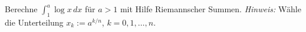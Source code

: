 \begin{prob}
Berechne $\int_1^a\log x\,dx$ f\"ur $a>1$ mit Hilfe Riemannscher
Summen. {\it Hinweis:} W\"ahle die Unterteilung $x_k:=a^{k/n}$,
$k=0,1,\dots,n$.  
\end{prob}
